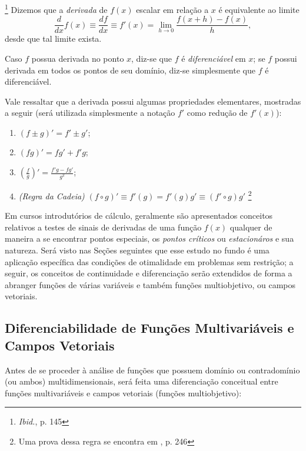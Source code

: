 \begin{definition}\footnote{\textit{Ibid.}, p. 145}
Dizemos que a \textit{derivada} de $f(x)$ escalar em rela\c{c}\~{a}o a $x$ \'{e} equivalente ao limite
\begin{equation}
\frac{d}{dx}f(x) \equiv \frac{df}{dx} \equiv f'(x) = \lim_{h \to 0} \frac{f(x+h)-f(x)}{h},
\end{equation}
desde que tal limite exista.
\end{definition}

Caso $f$ possua derivada no ponto $x$, diz-se que $f$ \'{e} \textit{diferenci\'{a}vel} em $x$; se $f$ possui derivada em todos os pontos de seu dom\'{i}nio, diz-se simplesmente que $f$ \'{e} diferenci\'{a}vel.

Vale ressaltar que a derivada possui algumas propriedades elementares, mostradas a seguir (ser\'{a} utilizada simplesmente a nota\c{c}\~{a}o $f'$ como redu\c{c}\~{a}o de $f'(x)$):
\begin{enumerate}[label=(\alph*)]
\item $(f \pm g)' = f' \pm g'$;
\item $(fg)' = fg' + f'g$;
\item $\left(\frac{f}{g}\right)' = \frac{f'g - fg'}{g^2}$;
\item \textit{(Regra da Cadeia)} $(f \circ g)' \equiv f'(g) = f'(g)g' \equiv (f' \circ g)g'$ \footnote{Uma prova dessa regra se encontra em \cite{thomas1}, p. 246}
\end{enumerate}

Em cursos introdut\'{o}rios de c\'{a}lculo, geralmente s\~{a}o apresentados conceitos relativos a testes de sinais de derivadas de uma fun\c{c}\~{a}o $f(x)$ qualquer de maneira a se encontrar pontos especiais, os \textit{pontos cr\'{i}ticos} ou \textit{estacion\'{a}ros} e sua natureza. Ser\'{a} visto nas Se\c{c}\~{o}es seguintes que esse estudo no fundo \'{e} uma aplica\c{c}\~{a}o espec\'{i}fica das condi\c{c}\~{o}es de otimalidade em problemas sem restri\c{c}\~{a}o; a seguir, os conceitos de continuidade e diferencia\c{c}\~{a}o ser\~{a}o extendidos de forma a abranger fun\c{c}\~{o}es de v\'{a}rias vari\'{a}veis e tamb\'{e}m fun\c{c}\~{o}es multiobjetivo, ou campos vetoriais.

\subsection{Diferenciabilidade de Fun\c{c}\~{o}es Multivari\'{a}veis e Campos Vetoriais}

Antes de se proceder \`{a} an\'{a}lise de fun\c{c}\~{o}es que possuem dom\'{i}nio ou contradom\'{i}nio (ou ambos) multidimensionais, ser\'{a} feita uma diferencia\c{c}\~{a}o conceitual entre fun\c{c}\~{o}es multivari\'{a}veis e campos vetoriais (fun\c{c}\~{o}es multiobjetivo):

